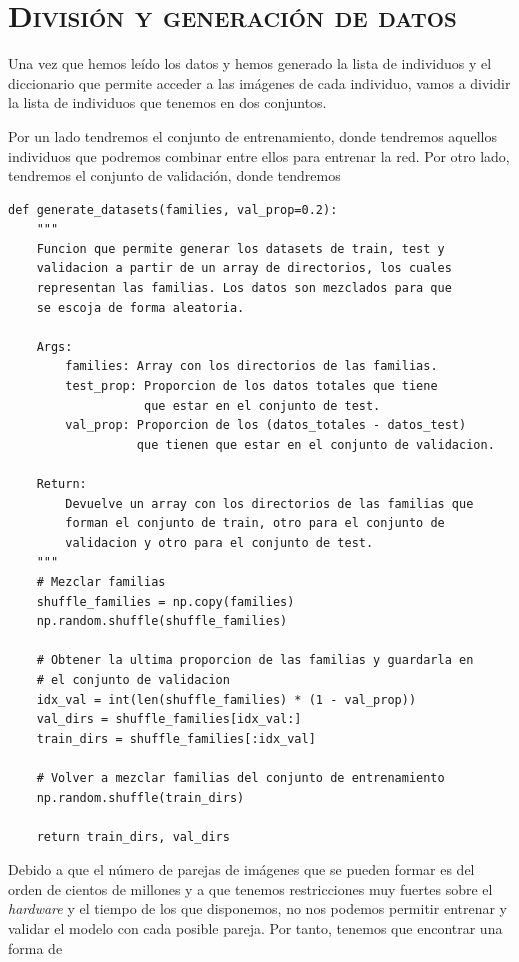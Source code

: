 \documentclass[11pt,a4paper]{article}
\begin{document}
\section{\textsc{División y generación de datos}}

Una vez que hemos leído los datos y hemos generado la lista de individuos y el diccionario
que permite acceder a las imágenes de cada individuo, vamos a dividir la lista de individuos
que tenemos en dos conjuntos.

Por un lado tendremos el conjunto de entrenamiento, donde tendremos aquellos individuos que
podremos combinar entre ellos para entrenar la red. Por otro lado, tendremos el conjunto de
validación, donde tendremos


\begin{lstlisting}
def generate_datasets(families, val_prop=0.2):
    """
    Funcion que permite generar los datasets de train, test y
    validacion a partir de un array de directorios, los cuales
    representan las familias. Los datos son mezclados para que
    se escoja de forma aleatoria.

    Args:
        families: Array con los directorios de las familias.
        test_prop: Proporcion de los datos totales que tiene
                   que estar en el conjunto de test.
        val_prop: Proporcion de los (datos_totales - datos_test)
                  que tienen que estar en el conjunto de validacion.
    
    Return:
        Devuelve un array con los directorios de las familias que
        forman el conjunto de train, otro para el conjunto de
        validacion y otro para el conjunto de test.
    """
    # Mezclar familias
    shuffle_families = np.copy(families)
    np.random.shuffle(shuffle_families)

    # Obtener la ultima proporcion de las familias y guardarla en
    # el conjunto de validacion
    idx_val = int(len(shuffle_families) * (1 - val_prop))
    val_dirs = shuffle_families[idx_val:]
    train_dirs = shuffle_families[:idx_val]

    # Volver a mezclar familias del conjunto de entrenamiento
    np.random.shuffle(train_dirs)

    return train_dirs, val_dirs
\end{lstlisting}

Debido a que el número de parejas de imágenes que se pueden formar es del orden de cientos de millones
y a que tenemos restricciones muy fuertes sobre el \textit{hardware} y el tiempo de los que disponemos,
no nos podemos permitir entrenar y validar el modelo con cada posible pareja. Por tanto, tenemos
que encontrar una forma de 
\end{document}
